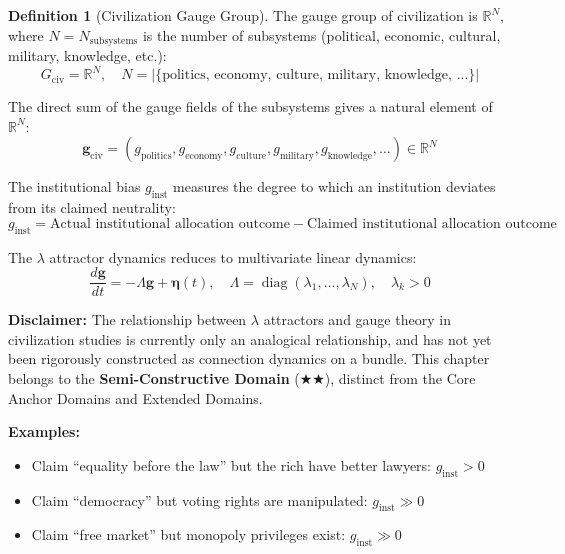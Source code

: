\documentclass[12pt,a4paper]{article}
\theoremstyle{plain}
\theoremstyle{definition}
\newtheorem{definition}[theorem]{Definition}
\newcommand{\R}{\mathbb{R}}
\newcommand{\gv}{\mathbf{g}}
\DeclareMathOperator{\diag}{diag}
\begin{document}
\begin{definition}[Civilization Gauge Group]
The gauge group of civilization is $\R^N$, where $N = N_{\text{subsystems}}$ is the number of subsystems (political, economic, cultural, military, knowledge, etc.):
\begin{equation}
    G_{\text{civ}} = \R^N, \quad N = |\{\text{politics, economy, culture, military, knowledge, ...}\}|
\end{equation}

The direct sum of the gauge fields of the subsystems gives a natural element of $\R^N$:
\begin{equation}
    \gv_{\text{civ}} = (g_{\text{politics}}, g_{\text{economy}}, g_{\text{culture}}, g_{\text{military}}, g_{\text{knowledge}}, \ldots) \in \R^N
\end{equation}

The institutional bias $g_{\text{inst}}$ measures the degree to which an institution deviates from its claimed neutrality:
\begin{equation}
    g_{\text{inst}} = \text{Actual institutional allocation outcome} - \text{Claimed institutional allocation outcome}
\end{equation}

The $\lambda$ attractor dynamics reduces to multivariate linear dynamics:
\begin{equation}
    \frac{d\gv}{dt} = -\Lambda \gv + \boldsymbol{\eta}(t), \quad \Lambda = \diag(\lambda_1, \ldots, \lambda_N), \quad \lambda_k > 0
\end{equation}

\textbf{Disclaimer:} The relationship between $\lambda$ attractors and gauge theory in civilization studies is currently only an analogical relationship,
and has not yet been rigorously constructed as connection dynamics on a bundle. This chapter belongs to the \textbf{Semi-Constructive Domain} (★★),
distinct from the Core Anchor Domains and Extended Domains.

\textbf{Examples:}
\begin{itemize}
    \item Claim ``equality before the law'' but the rich have better lawyers: $g_{\text{inst}} > 0$
    \item Claim ``democracy'' but voting rights are manipulated: $g_{\text{inst}} \gg 0$
    \item Claim ``free market'' but monopoly privileges exist: $g_{\text{inst}} \gg 0$
\end{itemize}
\end{definition}
\end{document}
